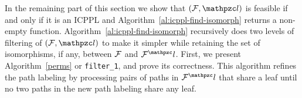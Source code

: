 \documentclass[MS]             %
              {iitmdiss_as}    %
\begin{document}
In the remaining part of this section we show that $(\cF,
\cl)$ is feasible if and only if it is an ICPPL and
Algorithm~\ref{al:icppl-find-isomorph} returns a non-empty
function. Algorithm~\ref{al:icppl-find-isomorph} recursively does two levels of
filtering of $(\cF, \cl)$ to make it simpler while retaining the set
of isomorphisms, if any, between ${\cal F}$ and $\cF^\cl$.
First, we present Algorithm~\ref{perms} or {\tt filter\_1}, and prove
its correctness.  This algorithm refines the path labeling by
processing pairs of paths in $\cF^\cl$ that share a leaf until no two
paths in the new path labeling share any leaf.
\end{document}
